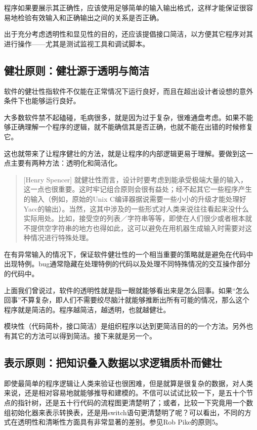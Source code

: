 \documentclass[12pt,oneside]{book}
\begin{document}
\begin{common-format}
程序如果要展示其正确性，应该使用足够简单的输入输出格式，这样才能保证很容易地检验有效输入和正确输出之间的关系是否正确。

出于充分考虑透明性和显见性的目的，还应该提倡接口简洁，以方便其它程序对其进行操作——尤其是测试监视工具和调试脚本。


\subsection{健壮原则：健壮源于透明与简洁}
软件的健壮性指软件不仅能在正常情况下运行良好，而且在超出设计者设想的意外条件下也能够运行良好。

大多数软件禁不起磕碰，毛病很多，就是因为过于复杂，很难通盘考虑。如果不能够正确理解一个程序的逻辑，就不能确信其是否正确，也就不能在出错的时候修复它。

这也就带来了让程序健壮的方法，就是让程序的内部逻辑更易于理解。要做到这一点主要有两种方法：透明化和简洁化。
\begin{quote}[Henry Spencer]
就健壮性而言，设计时要考虑到能承受极端大量的输入，这一点也很重要。这时牢记组合原则会很有益处；经不起其它一些程序产生的输入（例如，原始的Unix C编译器据说需要一些小小的升级才能处理好Yacc的输出）。当然，这其中涉及的一些形式对人类来说往往看起来没什么实际用处。比如，接受空的列表／字符串等等，即使在人们很少或者根本就不提供空字符串的地方也得如此，这可以避免在用机器生成输入时需要对这种情况进行特殊处理。
\end{quote}
    
在有异常输入的情况下，保证软件健壮性的一个相当重要的策略就是避免在代码中出现特例。bug通常隐藏在处理特例的代码以及处理不同特殊情况的交互操作部分的代码中。

上面我们曾说过，软件的透明性就是指一眼就能够看出来是怎么回事。如果“怎么回事”不算复杂，即人们不需要绞尽脑汁就能够推断出所有可能的情况，那么这个程序就是简洁的。程序越简洁，越透明，也就越健壮。

模块性（代码简朴，接口简洁）是组织程序以达到更简洁目的的一个方法。另外也有其它的方法可以得到简洁。接下来就是另一个。

\subsection{表示原则：把知识叠入数据以求逻辑质朴而健壮}
即使最简单的程序逻辑让人类来验证也很困难，但是就算是很复杂的数据，对人类来说，还是相对容易地就能够推导和建模的。不信可以试试比较一下，是五十个节点的指针树，还是五十行代码的流程图更清楚明了；或者，比较一下究竟用一个数组初始化器来表示转换表，还是用switch语句更清楚明了呢？可以看出，不同的方式在透明性和清晰性方面具有非常显著的差别。参见Rob Pike的原则5。


\end{common-format}
\end{document}
